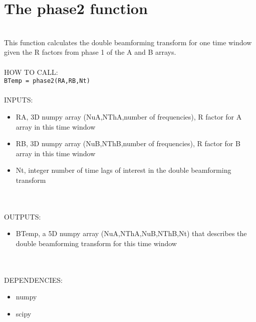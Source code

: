 \documentclass{article}
\begin{document}
\section{The phase2 function}
\\
This function calculates the double beamforming transform for one time window given the R factors from phase 1 of the A and B arrays.
\\
\\
HOW TO CALL:
\\
\texttt{BTemp = phase2(RA,RB,Nt)}
\\
\\
INPUTS:
\begin{itemize}
    \item RA, 3D numpy array (NuA,NThA,number of frequencies), R factor for A array in this time window
	\item RB, 3D numpy array (NuB,NThB,number of frequencies), R factor for B array in this time window
	\item Nt, integer number of time lags of interest in the double beamforming transform
\end{itemize}
\\
\\
OUTPUTS:
\begin{itemize}
    \item BTemp, a 5D numpy array (NuA,NThA,NuB,NThB,Nt) that describes the double beamforming transform for this time window
\end{itemize}
\\
\\
DEPENDENCIES:
\begin{itemize}
    \item numpy
    \item scipy 
\end{itemize}
\\
\\
\end{document}

